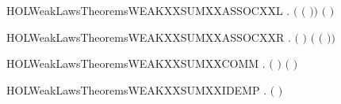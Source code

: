 \newcommand{\HOLWeakLawsTheoremsWEAKXXRESTRXXSUM}{\UseVerbatim{HOLWeakLawsTheoremsWEAKXXRESTRXXSUM}}
\begin{SaveVerbatim}{HOLWeakLawsTheoremsWEAKXXSUMXXASSOCXXL}
\HOLTokenTurnstile{} \HOLSymConst{\HOLTokenForall{}}  .  \ensuremath{(} \HOLSymConst{\ensuremath{+}} \ensuremath{(} \HOLSymConst{\ensuremath{+}} \ensuremath{)}\ensuremath{)} \ensuremath{(} \HOLSymConst{\ensuremath{+}}  \HOLSymConst{\ensuremath{+}} \ensuremath{)}
\end{SaveVerbatim}
\newcommand{\HOLWeakLawsTheoremsWEAKXXSUMXXASSOCXXL}{\UseVerbatim{HOLWeakLawsTheoremsWEAKXXSUMXXASSOCXXL}}
\begin{SaveVerbatim}{HOLWeakLawsTheoremsWEAKXXSUMXXASSOCXXR}
\HOLTokenTurnstile{} \HOLSymConst{\HOLTokenForall{}}  .  \ensuremath{(} \HOLSymConst{\ensuremath{+}}  \HOLSymConst{\ensuremath{+}} \ensuremath{)} \ensuremath{(} \HOLSymConst{\ensuremath{+}} \ensuremath{(} \HOLSymConst{\ensuremath{+}} \ensuremath{)}\ensuremath{)}
\end{SaveVerbatim}
\newcommand{\HOLWeakLawsTheoremsWEAKXXSUMXXASSOCXXR}{\UseVerbatim{HOLWeakLawsTheoremsWEAKXXSUMXXASSOCXXR}}
\begin{SaveVerbatim}{HOLWeakLawsTheoremsWEAKXXSUMXXCOMM}
\HOLTokenTurnstile{} \HOLSymConst{\HOLTokenForall{}} .  \ensuremath{(} \HOLSymConst{\ensuremath{+}} \ensuremath{)} \ensuremath{(} \HOLSymConst{\ensuremath{+}} \ensuremath{)}
\end{SaveVerbatim}
\newcommand{\HOLWeakLawsTheoremsWEAKXXSUMXXCOMM}{\UseVerbatim{HOLWeakLawsTheoremsWEAKXXSUMXXCOMM}}
\begin{SaveVerbatim}{HOLWeakLawsTheoremsWEAKXXSUMXXIDEMP}
\HOLTokenTurnstile{} \HOLSymConst{\HOLTokenForall{}}.  \ensuremath{(} \HOLSymConst{\ensuremath{+}} \ensuremath{)} 
\end{SaveVerbatim}
\newcommand{\HOLWeakLawsTheoremsWEAKXXSUMXXIDEMP}{\UseVerbatim{HOLWeakLawsTheoremsWEAKXXSUMXXIDEMP}}
